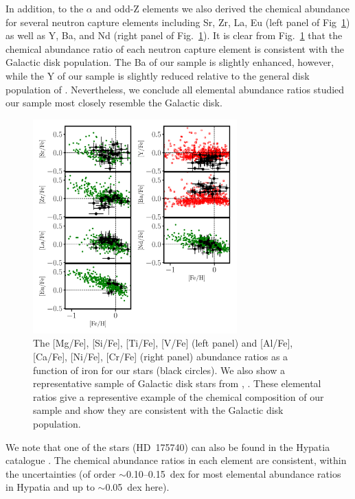 \documentclass[a4paper,fleqn,usenatbib]{mnras}
\begin{document}
In addition, to the $\alpha$ and odd-Z elements we also derived the chemical abundance for several neutron capture elements including Sr, Zr, La, Eu (left panel of Fig~\ref{fig:ncap}) as well as Y, Ba, and Nd (right panel of Fig.~\ref{fig:ncap}).  It is clear from Fig.~\ref{fig:ncap}  that the chemical abundance ratio of each neutron capture element is consistent with the Galactic disk population. The Ba of our sample is slightly enhanced, however, while the Y of our sample is slightly reduced relative to the general disk population of \cite{Bensby2014}. Nevertheless, we conclude all elemental abundance ratios studied our sample most closely resemble the Galactic disk. 
\begin{figure}
\noindent\includegraphics[width=0.7\textwidth,keepaspectratio]{Pope_ncap.pdf}

\caption{\label{fig:ncap}
The [Mg/Fe], [Si/Fe], [Ti/Fe], [V/Fe] (left panel) and [Al/Fe], [Ca/Fe], [Ni/Fe], [Cr/Fe] (right panel) abundance ratios as a function of iron for our stars (black circles). We also show a representative sample of Galactic disk stars from \citet[open red square,][]{Bensby2014}, \citet[green circles][]{Battistini2016}. These elemental ratios give a representive example of the chemical composition of our sample and show they are consistent with the Galactic disk population. } %
\end{figure}


We note that one of the stars (HD~175740) can also be found in the Hypatia catalogue \citep{hypatia}. The chemical abundance ratios in each element are consistent, within the uncertainties (of order $\sim$0.10--0.15~dex for most elemental abundance ratios in Hypatia and up to $\sim$0.05~dex here). 
\end{document}
